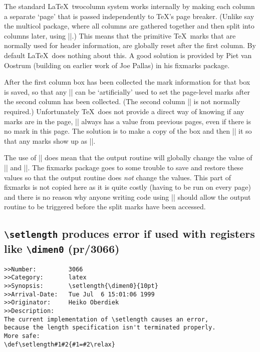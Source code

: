 \documentclass{ltxguide}
\newcommand\Lpack[1]{\mbox{\textsf{#1}}}
\begin{document}
The standard \LaTeX\ twocolumn system works internally by making
each column a separate `page' that is passed independently to \TeX's
page breaker. (Unlike say the \Lpack{multicol} package, where all
columns are gathered together and then split into columns later,
using |\vsplit|.) This means that the primitive \TeX\ marks that are
normally used for header information, are globally reset after the
first column. By default \LaTeX\ does nothing about this.
A good solution is provided by Piet van Oostrum (building on earlier
work of Joe Pallas) in his \Lpack{fixmarks} package.

After the first column box has been collected the mark information
for that box is saved, so that any |\firstmark| can be
`artificially' used to set the page-level marks after the second
column has been collected. (The second column |\firstmark| is not
normally required.) Unfortunately \TeX\ does not provide a direct
way of knowing if any marks are in the page, |\firstmark| always has a
value from previous pages, even if there is no mark in this page.
The solution is to make a copy of the box and then |\vsplit| it
so that any marks show up as |\splitfirstmark|.

The use of |\vsplit| does mean that the output routine will globally
change the value of |\splitfirstmark| and
|\splitbotmark|. The \Lpack{fixmarks} package goes to some trouble
to save and restore these values so that the output routine does
\emph{not} change the values. This part of \Lpack{fixmarks} is not
copied here as it is quite costly (having to be run on every page) and
there is no reason why anyone writing code using |\vsplit| should
allow the output routine to be triggered before the split marks have
been accessed.



\subsection{\texttt{\textbackslash setlength} produces error if
  used with registers like \texttt{\textbackslash dimen0} (pr/3066)}

\begin{verbatim}
>>Number:         3066
>>Category:       latex
>>Synopsis:       \setlength{\dimen0}{10pt}
>>Arrival-Date:   Tue Jul  6 15:01:06 1999
>>Originator:     Heiko Oberdiek
>>Description:
The current implementation of \setlength causes an error,
because the length specification isn't terminated properly.
More safe:
\def\setlength#1#2{#1=#2\relax}
\end{verbatim}
\end{document}
